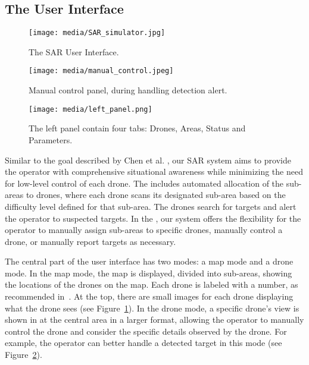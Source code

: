 
\subsection{The User Interface}
\begin{figure}[t]
\centering
\texttt{[image: media/SAR\_simulator.jpg]} %
\caption{The SAR User Interface.}
\label{fig:sar_simulator}
\end{figure}



\begin{figure}[t]
    \centering
    \texttt{[image: media/manual\_control.jpeg]}
    \caption{Manual control panel, during handling detection alert.}
    \label{fig:manual_control}
\end{figure}
\label{sec:sar}
\begin{figure}[t]
    \centering
    \texttt{[image: media/left\_panel.png]}
    \caption{The left panel contain four tabs: Drones, Areas, Status and Parameters.}
    \label{fig:left_panel}
\end{figure}

Similar to the goal described by Chen et al. \cite{chen2022multi}, our SAR system aims to provide the operator with comprehensive situational awareness while minimizing the need for low-level control of each drone. The  includes automated allocation of the sub-areas to drones, where each drone scans its designated sub-area based on the difficulty level defined for that sub-area. The drones search for targets and alert the operator to suspected targets.
In the , our system offers the flexibility for the operator to manually assign sub-areas to specific drones, manually control a drone, or manually report targets as necessary.

The central part of the user interface has two modes: a map mode and a drone mode. 
In the map mode, the map is displayed, divided into sub-areas, showing the locations of the drones on the map.  Each drone is labeled with a number, as recommended in~\cite{hoang2023challenges}.
At the top, there are small images for each drone displaying what the drone sees (see Figure~\ref{fig:sar_simulator}). In the drone mode, a specific drone's view is shown in at the central area in a larger format, allowing the operator to manually control the drone and consider the specific details observed by the drone. For example, the operator can better handle a detected target in this mode (see Figure~\ref{fig:manual_control}).

